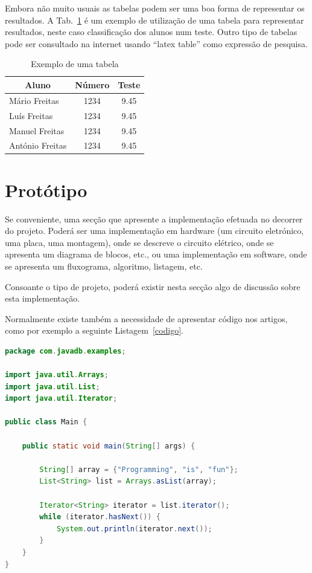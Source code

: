 \documentclass[journal, twoside, a4paper]{IEEEtran_LEEC_v1}
\begin{document}
Embora não muito usuais as tabelas podem ser uma boa forma de representar os resultados. A Tab.~\ref{tab:ExemploTabela1} é um exemplo de utilização de uma tabela para representar resultados, neste caso classificação dos alunos num teste. Outro tipo de tabelas pode ser consultado na internet usando ``latex table'' como expressão de pesquisa.

\begin{table}[ht]
	\caption{Exemplo de uma tabela}
	\label{tab:ExemploTabela1}
	\centering
	\begin{tabular}{lcc}
		\hline
		\multicolumn{1}{c}{\bf Aluno} & \bf Número & \bf Teste\\
		\hline
		\hline
		Mário Freitas & 1234 & 9.45\\
		Luís Freitas & 1234 & 9.45\\
		Manuel Freitas & 1234 & 9.45\\
		António Freitas & 1234 & 9.45\\
		\hline
		
	\end{tabular}
\end{table}

\section{Protótipo}
Se conveniente, uma secção que apresente a implementação efetuada no decorrer do projeto. Poderá ser uma implementação em hardware (um circuito eletrónico, uma placa, uma montagem), onde se descreve o circuito elétrico, onde se apresenta um diagrama de blocos, etc., ou uma implementação em software, onde se apresenta um fluxograma, algoritmo, listagem, etc.

Consoante o tipo de projeto, poderá existir nesta secção algo de discussão sobre esta implementação.

Normalmente existe também a necessidade de apresentar código nos artigos, como por exemplo a seguinte Listagem~\ref{codigo}.


\begin{lstlisting}[language=Java,caption={Exemplo de um código Java},label={codigo}]
package com.javadb.examples;

import java.util.Arrays;
import java.util.List;
import java.util.Iterator;

public class Main {

	public static void main(String[] args) {

		String[] array = {"Programming", "is", "fun"};
		List<String> list = Arrays.asList(array);
	
		Iterator<String> iterator = list.iterator();
		while (iterator.hasNext()) {
			System.out.println(iterator.next());
		}
	}
}
\end{lstlisting}
\end{document}
